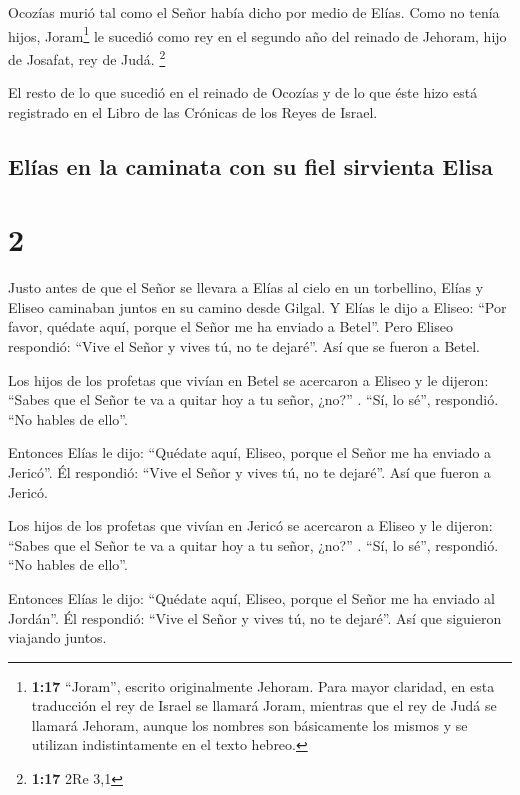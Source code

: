  Ocozías murió tal como el Señor había dicho por medio de
Elías. Como no tenía hijos, Joram\footnote{\textbf{1:17} ``Joram'',
  escrito originalmente Jehoram. Para mayor claridad, en esta traducción
  el rey de Israel se llamará Joram, mientras que el rey de Judá se
  llamará Jehoram, aunque los nombres son básicamente los mismos y se
  utilizan indistintamente en el texto hebreo.} le sucedió como rey en
el segundo año del reinado de Jehoram, hijo de Josafat, rey de Judá.
\footnote{\textbf{1:17} 2Re 3,1}

 El resto de lo que sucedió en el reinado de Ocozías y de
lo que éste hizo está registrado en el Libro de las Crónicas de los
Reyes de Israel.

\hypertarget{eluxedas-en-la-caminata-con-su-fiel-sirvienta-elisa}{%
\subsection{Elías en la caminata con su fiel sirvienta
Elisa}\label{eluxedas-en-la-caminata-con-su-fiel-sirvienta-elisa}}

\hypertarget{section-1}{%
\section{2}\label{section-1}}

 Justo antes de que el Señor se llevara a Elías al cielo
en un torbellino, Elías y Eliseo caminaban juntos en su camino desde
Gilgal.  Y Elías le dijo a Eliseo: ``Por favor, quédate
aquí, porque el Señor me ha enviado a Betel''. Pero Eliseo respondió:
``Vive el Señor y vives tú, no te dejaré''. Así que se fueron a Betel.

 Los hijos de los profetas que vivían en Betel se
acercaron a Eliseo y le dijeron: ``Sabes que el Señor te va a quitar hoy
a tu señor, ¿no?'' . ``Sí, lo sé'', respondió. ``No hables de ello''.

 Entonces Elías le dijo: ``Quédate aquí, Eliseo, porque el
Señor me ha enviado a Jericó''. Él respondió: ``Vive el Señor y vives
tú, no te dejaré''. Así que fueron a Jericó.

 Los hijos de los profetas que vivían en Jericó se
acercaron a Eliseo y le dijeron: ``Sabes que el Señor te va a quitar hoy
a tu señor, ¿no?'' . ``Sí, lo sé'', respondió. ``No hables de ello''.

 Entonces Elías le dijo: ``Quédate aquí, Eliseo, porque el
Señor me ha enviado al Jordán''. Él respondió: ``Vive el Señor y vives
tú, no te dejaré''. Así que siguieron viajando juntos.

